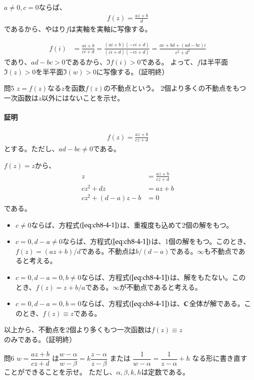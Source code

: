 $a\neq0,c=0$ならば、
\begin{align*}
    f(z)=\frac{az+b}{d}
\end{align*}
であるから、やはり$f$は実軸を実軸に写像する。

\begin{align*}
    f(i)&=\frac{ai+b}{ci+d}
    =\frac{(ai+b)(-ci+d)}{(ci+d)(-ci+d)}
    =\frac{ac+bd+(ad-bc)i}{c^2+d^2}
\end{align*}
であり、$ad-bc>0$であるから、$\Im f(i)>0$である。
よって、$f$は半平面$\Im(z)>0$を半平面$\Im(w)>0$に写像する。（証明終）

\newpage
\begin{mysimplebox}{問5}
    $z=f(z)$なる$z$を函数$f(z)$の不動点という。
    2個より多くの不動点をもつ一次函数は$z$以外にはないことを示せ。
\end{mysimplebox}
\paragraph{証明}
\begin{align*}
    f(z)=\frac{az+b}{cz+d}
\end{align*}
とする。ただし、$ad-bc\neq0$である。

$f(z)=z$から、
\begin{align}
    z&=\frac{az+b}{cz+d}\nonumber\\
    cz^2+dz&=az+b\nonumber\\
    cz^2+(d-a)z-b&=0\label{eq:ch8-4-1}
\end{align}
である。
\begin{itemize}
    \item $c\neq0$ならば、方程式$(\ref{eq:ch8-4-1})$は、重複度も込めて2個の解をもつ。
    \item $c=0,d-a\neq0$ならば、方程式$(\ref{eq:ch8-4-1})$は、1個の解をもつ。このとき、$f(z)=(az+b)/d$である。不動点は$b/(d-a)$である。$\infty$も不動点であると考える。
    \item $c=0,d-a=0,b\neq0$ならば、方程式$(\ref{eq:ch8-4-1})$は、解をもたない。このとき、$f(z)=z+b/a$である。$\infty$が不動点であると考える。
    \item $c=0,d-a=0,b=0$ならば、方程式$(\ref{eq:ch8-4-1})$は、$\mathbb{C}$全体が解である。このとき、$f(z)\equiv z$である。
\end{itemize}
以上から、不動点を2個より多くもつ一次函数は$f(z)\equiv z$のみである。（証明終）

\newpage
\begin{mysimplebox}{問6}
    $w=\dfrac{az+b}{cz+d}$
    は$\dfrac{w-\alpha}{w-\beta}=k\dfrac{z-\alpha}{z-\beta}$
    または
    $\dfrac{1}{w-\alpha}=\dfrac{1}{z-\alpha}+h$
    なる形に書き直すことができることを示せ。
    ただし、$\alpha,\beta,k,h$は定数である。
\end{mysimplebox}
